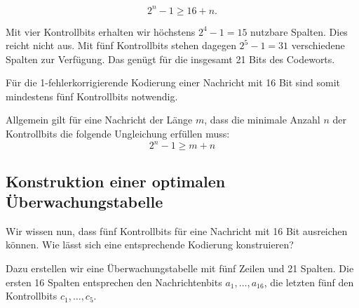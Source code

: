\[
    2^n-1\geq 16+n.
\]

Mit vier Kontrollbits erhalten wir höchstens
\(2^4-1=15\) nutzbare Spalten. Dies reicht nicht aus.
Mit fünf Kontrollbits stehen dagegen
\(2^5-1=31\) verschiedene Spalten zur Verfügung.
Das genügt für die insgesamt 21 Bits des Codeworts.

Für die 1-fehlerkorrigierende Kodierung einer Nachricht
mit 16 Bit sind somit mindestens fünf Kontrollbits notwendig.

\begin{myremark}
    Allgemein gilt für eine Nachricht der Länge \(m\), dass die
    minimale Anzahl \(n\) der Kontrollbits die folgende Ungleichung
    erfüllen muss:
    \[
        2^n-1\geq m+n
    \]
\end{myremark}





\subsection*{Konstruktion einer optimalen Überwachungstabelle}

Wir wissen nun, dass fünf Kontrollbits für eine Nachricht
mit 16 Bit ausreichen können. Wie lässt sich eine
entsprechende Kodierung konstruieren?

Dazu erstellen wir eine Überwachungstabelle mit fünf Zeilen
und 21 Spalten. Die ersten 16 Spalten entsprechen den
Nachrichtenbits \(a_1,\ldots,a_{16}\), die letzten fünf den
Kontrollbits \(c_1,\ldots,c_5\).

